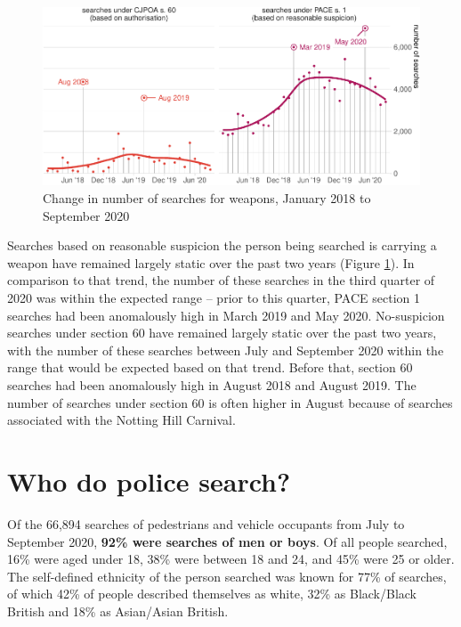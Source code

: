 \documentclass[
  a4paper,
  twoside, 11pt]{article}
\begin{document}
\begin{figure}[tb]

{\centering \includegraphics{2020-Q3_files/figure-latex/chart-trend-weapons-1} 

}

\caption{Change in number of searches for weapons, January 2018 to September 2020}\label{fig:chart-trend-weapons}
\end{figure}

Searches based on reasonable suspicion the person being searched is carrying a weapon have remained largely static over the past two years (Figure \ref{fig:chart-trend-weapons}). In comparison to that trend, the number of these searches in the third quarter of 2020 was within the expected range -- prior to this quarter, PACE section 1 searches had been anomalously high in March 2019 and May 2020.
No-suspicion searches under section 60 have remained largely static over the past two years, with the number of these searches between July and September 2020 within the range that would be expected based on that trend. Before that, section 60 searches had been anomalously high in August 2018 and August 2019. The number of searches under section 60 is often higher in August because of searches associated with the Notting Hill Carnival.

\hypertarget{who-do-police-search}{%
\section{Who do police search?}\label{who-do-police-search}}

Of the 66,894 searches of pedestrians and vehicle occupants from July to September 2020, \textbf{92\% were searches of men or boys}. Of all people searched, 16\% were aged under 18, 38\% were between 18 and 24, and 45\% were 25 or older. The self-defined ethnicity of the person searched was known for 77\% of searches, of which 42\% of people described themselves as white, 32\% as Black/Black British and 18\% as Asian/Asian British.
\end{document}
